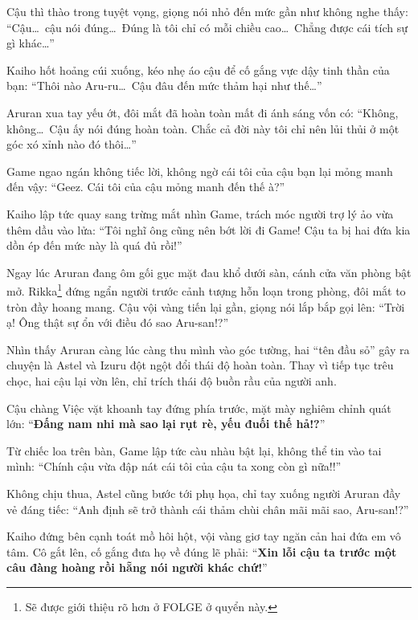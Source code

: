 \documentclass[../main.tex]{subfiles}
\begin{document}
Cậu thì thào trong tuyệt vọng, giọng nói nhỏ đến mức gần như không nghe thấy: ``Cậu\dots\ cậu nói đúng\dots\ Đúng là tôi chỉ có mỗi chiều cao\dots\ Chẳng được cái tích sự gì khác\dots''

Kaiho hốt hoảng cúi xuống, kéo nhẹ áo cậu để cố gắng vực dậy tinh thần của bạn: ``Thôi nào Aru-ru\dots\ Cậu đâu đến mức thảm hại như thế\dots''

Aruran xua tay yếu ớt, đôi mắt đã hoàn toàn mất đi ánh sáng vốn có: ``Không, không\dots\ Cậu ấy nói đúng hoàn toàn. Chắc cả đời này tôi chỉ nên lủi thủi ở một góc xó xỉnh nào đó thôi\dots''

Game ngao ngán không tiếc lời, không ngờ cái tôi của cậu bạn lại mỏng manh đến vậy: ``Geez. Cái tôi của cậu mỏng manh đến thế à?''

Kaiho lập tức quay sang trừng mắt nhìn Game, trách móc người trợ lý ảo vừa thêm dầu vào lửa: ``Tôi nghĩ ông cũng nên bớt lời đi Game! Cậu ta bị hai đứa kia dồn ép đến mức này là quá đủ rồi!''

\ct

Ngay lúc Aruran đang ôm gối gục mặt đau khổ dưới sàn, cánh cửa văn phòng bật mở. Rikka\footnote{Sẽ được giới thiệu rõ hơn ở {\humanist FOLGE } ở quyển này.} đứng ngẩn người trước cảnh tượng hỗn loạn trong phòng, đôi mắt to tròn đầy hoang mang. Cậu vội vàng tiến lại gần, giọng nói lắp bắp gọi lên: ``Trời ạ! Ông thật sự ổn với điều đó sao Aru-san!?''


Nhìn thấy Aruran càng lúc càng thu mình vào góc tường, hai ``tên đầu sỏ'' gây ra chuyện là Astel và Izuru đột ngột đổi thái độ hoàn toàn. Thay vì tiếp tục trêu chọc, hai cậu lại vờn lên, chỉ trích thái độ buồn rầu của người anh.

Cậu chàng Việc vặt khoanh tay đứng phía trước, mặt mày nghiêm chỉnh quát lớn: ``\textbf{Đấng nam nhi mà sao lại rụt rè, yếu đuối thế hả!?}''

Từ chiếc loa trên bàn, Game lập tức càu nhàu bật lại, không thể tin vào tai mình: ``Chính cậu vừa đập nát cái tôi của cậu ta xong còn gì nữa!!''

Không chịu thua, Astel cũng bước tới phụ họa, chỉ tay xuống người Aruran đầy vẻ đáng tiếc: ``Anh định sẽ trở thành cái thảm chùi chân mãi mãi sao, Aru-san!?''

Kaiho đứng bên cạnh toát mồ hôi hột, vội vàng giơ tay ngăn cản hai đứa em vô tâm. Cô gắt lên, cố gắng đưa họ về đúng lẽ phải: ``\textbf{Xin lỗi cậu ta trước một câu đàng hoàng rồi hẵng nói người khác chứ!}''
\end{document}
